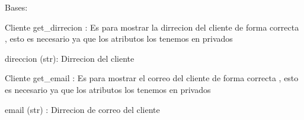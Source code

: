 \documentclass[letterpaper,10pt,spanish]{sphinxmanual}
\begin{document}
\begin{fulllineitems}
\label{\detokenize{projects:projects.Clientes.Cliente}}
\pysigstartsignatures
{}
\pysigstopsignatures
\sphinxAtStartPar
Bases: 

\begin{fulllineitems}
\label{\detokenize{projects:projects.Clientes.Cliente.get_direccion}}
\pysigstartsignatures
{}
\pysigstopsignatures
\sphinxAtStartPar
Cliente get\_dirrecion : Es para mostrar la dirrecion del cliente de forma correcta , esto es necesario ya que los atributos los tenemos en privados
\begin{description}
\sphinxAtStartPar
direccion (str): Dirrecion del cliente

\end{description}

\end{fulllineitems}


\begin{fulllineitems}
\label{\detokenize{projects:projects.Clientes.Cliente.get_email}}
\pysigstartsignatures
{}
\pysigstopsignatures
\sphinxAtStartPar
Cliente get\_email : Es para mostrar el correo del cliente de forma correcta , esto es necesario ya que los atributos los tenemos en privados
\begin{description}
\sphinxAtStartPar
email (str) : Dirrecion de correo del cliente

\end{description}


\end{fulllineitems}
\end{fulllineitems}
\end{document}
